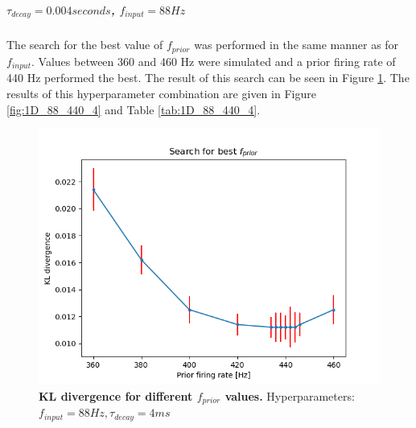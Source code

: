 \subparagraph{$\tau_{decay} = 0.004 seconds$, $f_{input} = 88 Hz$}
The search for the best value of $f_{prior}$ was performed in the same manner as for $f_{input}$. Values between 360 and 460 Hz were simulated and a prior firing rate of 440 Hz performed the best. The result of this search can be seen in Figure \ref{fig:1D_KLD_fInput88_tau4}. The results of this hyperparameter combination are given in Figure \ref{fig:1D_88_440_4} and Table \ref{tab:1D_88_440_4}.

\begin{figure}
\centering
  \includegraphics[width=0.75\linewidth]{figures/1D/KLDvsfPrior_fInput88tau4.png}
  \caption{\textbf{KL divergence for different $f_{prior}$ values.} Hyperparameters: $f_{input} = 88 Hz, \tau_{decay} = 4 ms$}
  \label{fig:1D_KLD_fInput88_tau4}
\end{figure}

